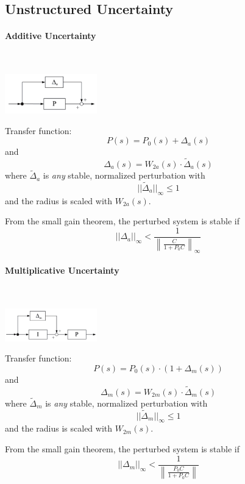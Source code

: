 \subsection{Unstructured Uncertainty}

\begin{minipage}[b]{0.5\linewidth}
    \paragraph{Additive Uncertainty}~\\
    \begin{center}
        \includegraphics[width=4cm]{bilder/rob_add.png}
    \end{center}
    Transfer function:
    \[
        P(s) = P_0(s) + \Delta_a(s)
    \]
    and
    \[
        \Delta_a(s) = W_{2a}(s) \cdot \tilde{\Delta}_a(s)
    \]
    where $\tilde{\Delta}_a$ is \emph{any} stable, normalized perturbation with
    \[
        ||\tilde{\Delta}_a||_{\infty} \leq 1
    \]
    and the radius is scaled with $W_{2a}(s)$.
    
    From the small gain theorem, the perturbed system is stable if
    \[
        ||\Delta_a||_{\infty} < \frac{1}{\left\lVert\frac{C}{1+P_0C}\right\rVert_{\infty}}
    \]
\end{minipage}
\begin{minipage}[b]{0.5\linewidth}
    \paragraph{Multiplicative Uncertainty}~\\
    \begin{center}
        \includegraphics[width=4cm]{bilder/rob_mult.png}
    \end{center}
    Transfer function:
    \[
        P(s) = P_0(s) \cdot (1 + \Delta_m(s))
    \]
    and
    \[
        \Delta_m(s) = W_{2m}(s) \cdot \tilde{\Delta}_m(s)
    \]
    where $\tilde{\Delta}_m$ is \emph{any} stable, normalized perturbation with
    \[
        ||\tilde{\Delta}_m||_{\infty} \leq 1
    \]
    and the radius is scaled with $W_{2m}(s)$.
    
    From the small gain theorem, the perturbed system is stable if
    \[
        ||\Delta_m||_{\infty} < \frac{1}{\left\lVert\frac{P_0C}{1+P_0C}\right\rVert}
    \]
\end{minipage}
\vspace{0.5em}

